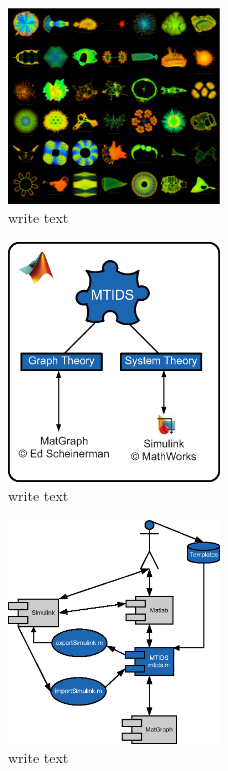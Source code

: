 \documentclass[a4paper,twoside, openright,12pt]{report}
\begin{document}
\begin{figure}[htb]
\centering
\includegraphics[width=0.5\textwidth]{pics/complex.eps}
\caption[write text]{write text}
\label{modelNormal1}
\end{figure}



\begin{figure}[htb]
\centering
\includegraphics[width=0.5\textwidth]{pics/mtidsstructure.eps}
\caption[write text]{write text}
\label{modelNormal1}
\end{figure}



\begin{figure}[htb]
\centering
\includegraphics[width=0.5\textwidth]{pics/uml.eps}
\caption[write text]{write text}
\label{modelNormal1}
\end{figure}
\end{document}
